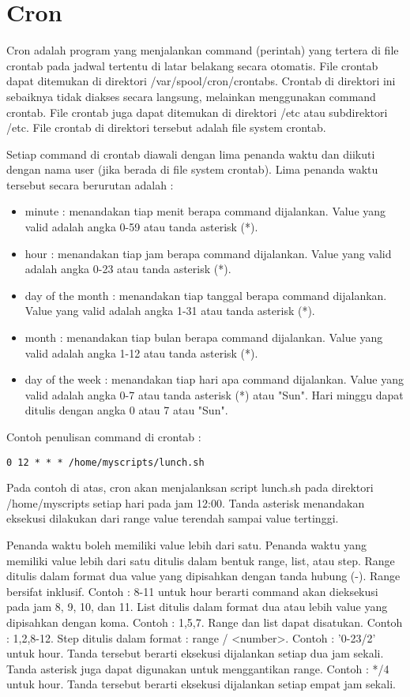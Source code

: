 \section{Cron ~\cite{vixie1cron}}
\label{cron}
Cron adalah program yang menjalankan command (perintah) yang tertera di file crontab pada jadwal tertentu di latar belakang secara otomatis. File crontab dapat ditemukan di direktori /var/spool/cron/crontabs. Crontab di  direktori ini sebaiknya tidak diakses secara langsung, melainkan menggunakan command crontab. File crontab juga dapat ditemukan di direktori /etc atau subdirektori /etc. File crontab di direktori tersebut adalah file system crontab.

Setiap command di crontab diawali dengan lima penanda waktu dan diikuti dengan nama user (jika berada di file system crontab). Lima penanda waktu tersebut secara berurutan adalah :
\begin{itemize}
\item minute : menandakan tiap menit berapa command dijalankan. Value yang valid adalah angka 0-59 atau tanda asterisk (*).
\item hour : menandakan tiap jam berapa command dijalankan. Value yang valid adalah angka 0-23 atau tanda asterisk (*).
\item day of the month : menandakan tiap tanggal berapa command dijalankan. Value yang valid adalah angka 1-31 atau tanda asterisk (*).
\item month : menandakan tiap bulan berapa command dijalankan. Value yang valid adalah angka 1-12 atau tanda asterisk (*).
\item day of the week : menandakan tiap hari apa command dijalankan. Value yang valid adalah angka 0-7 atau tanda asterisk (*) atau "Sun". Hari minggu dapat ditulis dengan angka 0 atau 7 atau "Sun".
\end{itemize}

Contoh penulisan command di crontab :
\begin{lstlisting}
0 12 * * * /home/myscripts/lunch.sh
\end{lstlisting}
Pada contoh di atas, cron akan menjalanksan script lunch.sh pada direktori /home/myscripts setiap hari pada jam 12:00. Tanda asterisk menandakan eksekusi dilakukan dari range value terendah sampai value tertinggi.

Penanda waktu boleh memiliki value lebih dari satu. Penanda waktu yang memiliki value lebih dari satu ditulis dalam bentuk range, list, atau step. Range ditulis dalam format dua value yang dipisahkan dengan tanda hubung (-). Range bersifat inklusif. Contoh : 8-11 untuk hour berarti command akan dieksekusi pada jam 8, 9, 10, dan 11. List ditulis dalam format dua atau lebih value yang dipisahkan dengan koma. Contoh : 1,5,7. Range dan list dapat disatukan. Contoh : 1,2,8-12. Step ditulis dalam format : range / <number>. Contoh : '0-23/2' untuk hour. Tanda tersebut berarti eksekusi dijalankan setiap dua jam sekali. Tanda asterisk juga dapat digunakan untuk menggantikan range. Contoh : */4 untuk hour. Tanda tersebut berarti eksekusi dijalankan setiap empat jam sekali.

